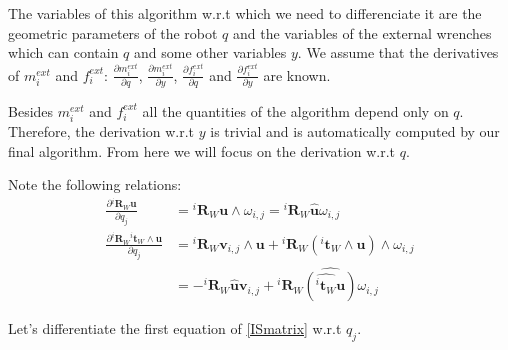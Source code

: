 The variables of this algorithm w.r.t which we need to differenciate it are the geometric parameters of the robot $q$ and the variables of the external wrenches which can contain $q$ and some other variables $y$.
We assume that the derivatives of $m_i^{ext}$ and $f_i^{ext}$: $\frac{\partial m_i^{ext}}{\partial q}$, $\frac{\partial m_i^{ext}}{\partial y}$, $\frac{\partial f_i^{ext}}{\partial q}$ and $\frac{\partial f_i^{ext}}{\partial y}$ are known.

Besides $m_i^{ext}$ and $f_i^{ext}$ all the quantities of the algorithm depend only on $q$.
Therefore, the derivation w.r.t $y$ is trivial and is automatically computed by our final algorithm.
From here we will focus on the derivation w.r.t $q$.

Note the following relations:
\begin{align}
  \frac{\partial {}^i\mathbf{R}_W \mathbf{u}}{\partial q_j}
  &= {}^i\mathbf{R}_W \mathbf{u} \wedge \omega_{i,j}
  = {}^i\mathbf{R}_W \widehat{\mathbf{u}} \omega_{i,j}
  \\
  \frac{\partial {}^i\mathbf{R}_W {}^i\mathbf{t}_W\wedge \mathbf{u}}{\partial q_j}
  &= {}^i\mathbf{R}_W \mathbf{v}_{i,j} \wedge \mathbf{u}
  + {}^i\mathbf{R}_W \left({}^i\mathbf{t}_W\wedge\mathbf{u}\right) \wedge \omega_{i,j}\\
  &= -{}^i\mathbf{R}_W \widehat{\mathbf{u}} \mathbf{v}_{i,j}
  + {}^i\mathbf{R}_W \widehat{\left(\widehat{{}^i\mathbf{t}_W}\mathbf{u}\right)} \omega_{i,j}
\end{align}

Let's differentiate the first equation of \ref{ISmatrix} w.r.t $q_j$.


